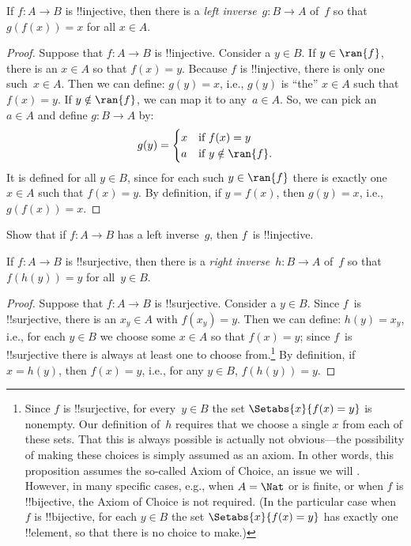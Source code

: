 \documentclass[../../../include/open-logic-section]{subfiles}
\begin{document}
\begin{prop}
If $f\colon A \to B$ is !!{injective}, then there is a \emph{left
inverse}~$g\colon B \to A$ of~$f$ so that $g(f(x)) = x$ for all $x
\in A$.
\end{prop}

\begin{proof}
Suppose that $f\colon A \to B$ is !!{injective}. Consider a $y \in B$.
If $y \in \ran{f}$, there is an $x \in A$ so that $f(x) = y$. Because
$f$ is !!{injective}, there is only one such~$x \in A$. Then we can
define: $g(y) = x$, i.e., $g(y)$ is ``the'' $x \in A$ such that $f(x)
= y$.  If $y \notin \ran{f}$, we can map it to any~$a \in A$. So, we
can pick an $a \in A$ and define $g\colon B \to A$ by:
\[
g(y) = \begin{cases}
    x & \text{if $f(x) = y$}\\
    a & \text{if $y \notin \ran{f}$.}
\end{cases}
\]
It is defined for all $y \in B$, since for each such $y \in \ran{f}$
there is exactly one $x \in A$ such that $f(x) = y$. By definition, if
$y = f(x)$, then $g(y) = x$, i.e., $g(f(x)) = x$.
\end{proof}

\begin{prob}
Show that if $f\colon A \to B$ has a left inverse~$g$, then $f$~is
!!{injective}.
\end{prob}

\begin{prop}
    If $f\colon A \to B$ is !!{surjective}, then there is a
    \emph{right inverse}~$h\colon B \to A$ of~$f$ so that $f(h(y)) =
    y$ for all~$y \in B$.
\end{prop}

\begin{proof}
Suppose that $f\colon A \to B$ is !!{surjective}. Consider a $y \in
B$. Since $f$~is !!{surjective}, there is an $x_y \in A$ with $f(x_y)
= y$.  Then we can define: $h(y) = x_y$, i.e., for each $y \in B$ we
choose some $x \in A$ so that $f(x) = y$; since $f$~is !!{surjective}
there is always at least one to choose from.\footnote{Since $f$ is
!!{surjective}, for every~$y \in B$ the set $\Setabs{x}{f(x) = y}$ is
nonempty. Our definition of~$h$ requires that we choose a single $x$
from each of these sets. That this is always possible is actually not
obvious---the possibility of making these choices is simply assumed as an axiom. 
In other words, this proposition assumes the so-called Axiom of
Choice, an issue we will . 
However, in many specific cases, e.g., when $A = \Nat$ or is finite, or when $f$ is !!{bijective},
the Axiom of Choice is not required. (In the particular case when $f$ is !!{bijective}, for each $y \in B$ the set 
$\Setabs{x}{f(x) = y}$ has exactly one !!{element}, so that there is no choice to make.)} 
By definition, if $x = h(y)$,
then $f(x) = y$, i.e., for any $y \in B$, $f(h(y)) = y$.
\end{proof}
\end{document}
